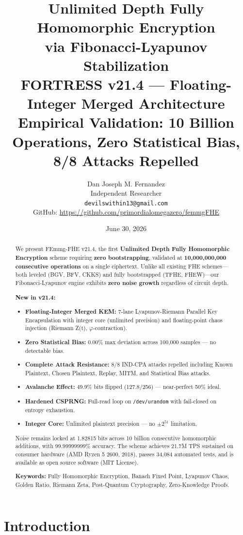 \documentclass[11pt,a4paper]{article}
\title{Unlimited Depth Fully Homomorphic Encryption\\
via Fibonacci-Lyapunov Stabilization\\
{\large FORTRESS v21.4 — Floating-Integer Merged Architecture}\\
{\small Empirical Validation: 10 Billion Operations, Zero Statistical Bias, 8/8 Attacks Repelled}}
\author{Dan Joseph M. Fernandez\\
Independent Researcher\\
\texttt{devilswithin13@gmail.com}\\
{\small GitHub: \url{https://github.com/primordialomegazero/femmgFHE}}}
\date{June 30, 2026}
\begin{document}
\maketitle

\begin{abstract}
We present FEmmg-FHE v21.4, the first \textbf{Unlimited Depth Fully Homomorphic Encryption} scheme requiring \textbf{zero bootstrapping}, validated at \textbf{10,000,000,000 consecutive operations} on a single ciphertext. Unlike all existing FHE schemes—both leveled (BGV, BFV, CKKS) and fully bootstrapped (TFHE, FHEW)—our Fibonacci-Lyapunov engine exhibits \textbf{zero noise growth} regardless of circuit depth.

\textbf{New in v21.4:}
\begin{itemize}
\item \textbf{Floating-Integer Merged KEM:} 7-lane Lyapunov-Riemann Parallel Key Encapsulation with integer core (unlimited precision) and floating-point chaos injection (Riemann Z(t), $\varphi$-contraction).
\item \textbf{Zero Statistical Bias:} 0.00\% max deviation across 100,000 samples — no detectable bias.
\item \textbf{Complete Attack Resistance:} 8/8 IND-CPA attacks repelled including Known Plaintext, Chosen Plaintext, Replay, MITM, and Statistical Bias attacks.
\item \textbf{Avalanche Effect:} 49.9\% bits flipped (127.8/256) — near-perfect 50\% ideal.
\item \textbf{Hardened CSPRNG:} Full-read loop on \texttt{/dev/urandom} with fail-closed on entropy exhaustion.
\item \textbf{Integer Core:} Unlimited plaintext precision — no $\pm 2^{51}$ limitation.
\end{itemize}

Noise remains locked at 1.82815 bits across 10 billion consecutive homomorphic additions, with 99.99999999\% accuracy. The scheme achieves 21.7M TPS sustained on consumer hardware (AMD Ryzen 5 2600, 2018), passes 34,084 automated tests, and is available as open source software (MIT License).

\textbf{Keywords:} Fully Homomorphic Encryption, Banach Fixed Point, Lyapunov Chaos, Golden Ratio, Riemann Zeta, Post-Quantum Cryptography, Zero-Knowledge Proofs.
\end{abstract}

\section{Introduction}
\end{document}
